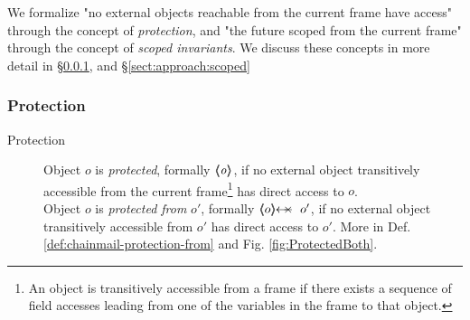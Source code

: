 \vspace{.2cm}
 
\noindent 
We formalize "no external objects  reachable from the current frame have access" through the concept of \emph{protection}, 
and "the future scoped from the current frame" through  the concept of \emph{scoped invariants}. 
We discuss these concepts in more detail in \S \ref{sect:approach:protection}, and \S \ref{sect:approach:scoped}


\subsubsection{Protection}
\label{sect:approach:protection}


 \begin{description}
\item[Protection] 
Object $o$ is \emph{protected}, formally ${\langle\!\!\langle \mbox{\normalfont{\texttt{\it{o}}}} \rangle\!\!\rangle}$,  
if no external object transitively accessible from the current frame\footnote{An object is transitively accessible from a frame if
 there exists a sequence of field accesses leading from one of the variables in the frame  to that object.} 
has direct access to $o$. 
\\
Object $o$ is \emph{protected  from} $o'$, formally $\protectedFrom {o} {o'}$,  
if no external object transitively accessible from $o'$ has direct access to $o'$.
More in Def. \ref{def:chainmail-protection-from} and Fig. \ref{fig:ProtectedBoth}.   
 \end{description}
 



